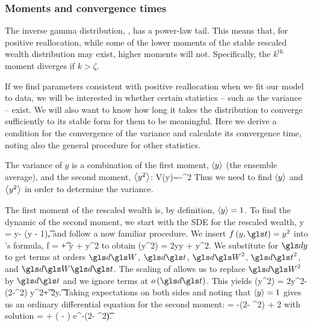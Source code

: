 
\subsubsection{Moments and convergence times}
The inverse gamma distribution, , has a power-law tail. This means that, for positive reallocation, while some of the lower moments of the stable rescaled wealth distribution may exist, higher moments will not. Specifically, the $k^\text{th}$ moment diverges if $k>\zeta$. 

If we find parameters consistent with positive reallocation when we fit our model to data, we will be interested in whether certain statistics -- such as the variance -- exist. We will also want to know how long it takes the distribution to converge sufficiently to its stable form for them to be meaningful. Here we derive a condition for the convergence of the variance and calculate its convergence time, noting also the general procedure for other statistics.

The variance of $y$ is a combination of the first moment, $\left\langle y \right\rangle$ (the ensemble average), and the second moment, $\left\langle y^2 \right\rangle$:
\be
V(y)=-^2
\ee
Thus we need to find $\left\langle y \right\rangle$ and $\left\langle y^2 \right\rangle$ in order to determine the variance.

The first moment of the rescaled wealth is, by definition, $\left\langle y \right\rangle=1$. To find the dynamic of the second moment, we start with the SDE for the rescaled wealth,
\be
\gd y = \gsigma y\gd\gW - \tau\left(y - 1\right)\gd\t,
\ee
and follow a now familiar procedure. We insert $f\left(y,\t\right)=y^2$ into \Ito's formula,
\be
\gd f =  \gd\t +  \gd y +  \gd y^2
\ee
to obtain
\be
\gd \left(y^2\right) = 2y\gd y + \gd y^2.
\ee
We substitute  for $\gd y$ to get terms at orders $\gd\gW$, $\gd\t$, $\gd\gW^2$, $\gd\t^2$, and $\gd\gW\gd\t$. The scaling of \BM allows us to replace $\gd\gW^2$ by $\gd\t$ and we ignore terms at $o\left(\gd\t\right)$. This yields
\bea
\gd \left(y^2\right) = 2\gsigma y^2\gd\gW - \left(2\tau-\gsigma^2\right) y^2\gd\t + 2\tau y\gd\t.
\eea
Taking expectations on both sides and noting that $\left\langle y \right\rangle=1$ gives us an ordinary differential equation for the second moment:
\be
{} = -\left(2\tau - \gsigma^2\right)  + 2\tau
{}
\ee
with solution
\be
{} =  + \left( - \right) e^{-\left(2\tau - \gsigma^2\right)\t}.
\ee


